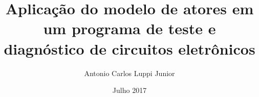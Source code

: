 \documentclass[a5paper]{ufsc-thesis}
\title{Aplicação do modelo de atores em um programa de teste e diagnóstico de circuitos eletrônicos}
\author{Antonio Carlos Luppi Junior}
\date{Julho 2017}
\begin{document}
\pretextual
\imprimircapa
\imprimirfolhaderosto*

\begin{fichacatalografica}
    
\end{fichacatalografica}

\begin{folhadeaprovacao}
    
\end{folhadeaprovacao}

    
  \textual
    
    
    
    
    
    

\postextual

%



\end{document}
